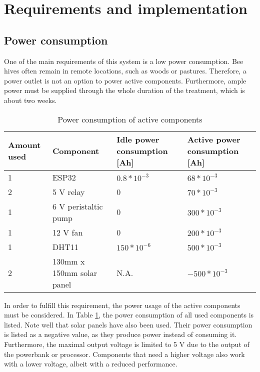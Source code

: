 \section{Requirements and implementation}\label{sec:requirements-and-implementation}

\subsection{Power consumption}\label{subsec:power-consumption}

One of the main requirements of this system is a low power consumption.
Bee hives often remain in remote locations, such as woods or pastures.
Therefore, a power outlet is not an option to power active components.
Furthermore, ample power must be supplied through the whole duration of the treatment, which is about two weeks.

\begin{table}
    \centering
    \caption{Power consumption of active components}
    \label{tab:power-consumption-of-active-components}
    \renewcommand{\arraystretch}{1.2}
    \begin{tabular}{l|l|l|l}
        Amount used & Component & Idle power consumption [Ah] & Active power consumption [Ah] \\
        \hline
        1 & ESP32 &  $0.8 * 10^{-3}$ & $68 * 10^{-3}$ \\
        2 & 5 V relay & 0 & $70 * 10^{-3}$ \\
        1 & 6 V peristaltic pump & 0 & $300 * 10^{-3}$ \\
        1 & 12 V fan & 0 & $200 * 10^{-3} $ \\
        1 & DHT11 & $150 * 10^{-6}$ & $500 * 10^{-3}$ \\
        2 & 130mm x 150mm solar panel & N.A. & $- 500 * 10^{-3}$
    \end{tabular}
\end{table}


In order to fulfill this requirement, the power usage of the active components must be considered.
In Table \ref{tab:power-consumption-of-active-components}, the power consumption of all used components is listed.
Note well that solar panels have also been used.
Their power consumption is listed as a negative value, as they produce power instead of consuming it.
Furthermore, the maximal output voltage is limited to 5 V due to the output of the powerbank or processor.
Components that need a higher voltage also work with a lower voltage, albeit with a reduced performance.

